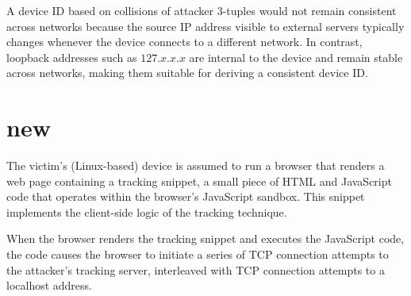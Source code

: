 \documentclass{report}
\begin{document}


A device ID based on collisions of \alert{attacker 3-tuples} would not remain consistent across networks because the source IP address visible to external servers typically changes whenever the device connects to a different network. In contrast, loopback addresses such as $127.x.x.x$ are internal to the device and remain stable across networks, making them suitable for deriving a consistent device ID. %

\section{new}
\label{sec:new}

The victim’s (Linux-based) device is assumed to run a browser that renders a web page containing a \alert{tracking snippet}, a small piece of HTML and JavaScript code that operates within the browser’s JavaScript sandbox. This snippet implements the client-side logic of the tracking technique.

When the browser renders the tracking snippet and executes the JavaScript code, the code causes the browser to initiate a series of TCP connection attempts to the attacker’s tracking server, interleaved with TCP connection attempts to a localhost address.
\end{document}
